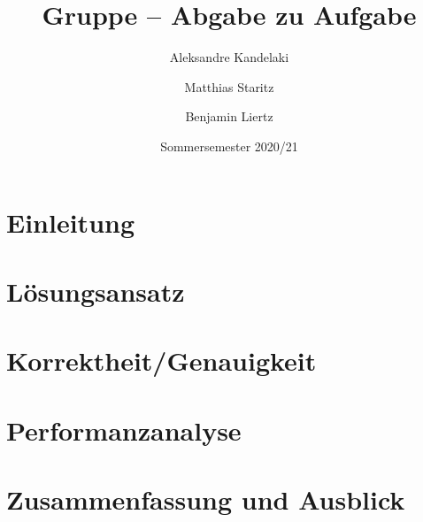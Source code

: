 \documentclass[course=erap]{aspdoc}
\author{⁨Aleksandre Kandelaki \and Matthias Staritz \and Benjamin Liertz}
\date{Sommersemester 2020/21} %
\title{Gruppe \theGroup{} -- Abgabe zu Aufgabe \theNumber}
\begin{document}
\maketitle

\section{Einleitung}


\section{Lösungsansatz}


\section{Korrektheit/Genauigkeit}


\section{Performanzanalyse}


\section{Zusammenfassung und Ausblick}


{}
\end{document}
